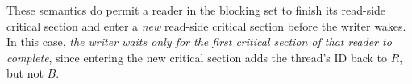 These semantics do permit a reader in the blocking set to finish its read-side critical section and enter a \emph{new} read-side critical section before the writer wakes.  In this case, \emph{the writer waits only for the first critical section of that reader to complete}, since entering the new critical section adds the thread's ID back to $R$, but not $B$.
\begin{comment}
Next, we introduce the instantiation of concrete program states and transitions in between these states for our introductory example, bag example shown in the figure \ref{fig:rculist}. Figures \ref{fig:readlist}-\ref{fig:prereclaim} show the crucial program states in \textsf{RCU} setting.
 \begin{figure}[H]
\centering
 \begin{tikzpicture}[>=stealth',node distance=1.5cm,semithick,auto]
 \tikzstyle{hollow node}=[circle,draw,inner sep=1]
 \tikzstyle{sub node}=[triangle,draw,inner sep=1]
 \tikzstyle{solid node}=[rectangle,draw,inner sep=1.5]

 \tikzset{
 	red node/.style={rectangle,draw=black,fill=black,inner sep=1.5},
 	blue node/.style={rectangle,draw=black,inner sep=1.5},
 	reader node/.style={circle,draw=black,inner sep=1},
 	writer node/.style={circle,draw=black,inner sep=1}
 }

     \node[solid node] (R) {$R$};
     \node[hollow node] (5) [right of=R] {$5$};
    \node[hollow node] (8) [right of=5] {$8$};
     \node[hollow node] (2) [right of=8] {$2$};
     \node[hollow node] (1) [right of=2] {$1$};
    \node[hollow node] (11) [right of=1] {$11$};
   \node[reader node] (r1) [above right of= 1]  {$cr$};
     \node[reader node] (r2)  [above left of= 1] {$cr$};

     \path[->]   (R) edge node {} (5)
                 (5) edge node {} (8)
 		(8) edge node {} (2)
 		(2) edge node {} (1)
 		(1) edge node {} (11)
 		(r1) edge node {$\textsf{tid}_{r1}$} (1)
 		(r2) edge node {$\textsf{tid}_{r2}$} (1)
 ;
 \end{tikzpicture}
 \caption{$R$ is unique root of the \textsf{RCU} singly linked list. Two concurrent reader threads with $\textsf{tid}_{r1}$ and $\textsf{tid}_{r2}$ ids are on the node with value 1. These threads have their own iterators $\textsf{cr}$ on linked list. }
 \label{fig:readlist}
 \end{figure}
 In the figure \ref{fig:readlist}, there are two reader threads in read block, $R\uplus \{tid_{r1},tid_{r2}\}$.


\end{comment}
